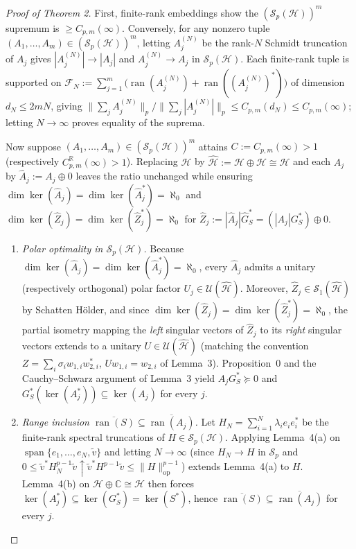 \documentclass[10pt,letterpaper]{article}
\newcommand{\C}{\mathbb{C}}
\newcommand{\R}{\mathbb{R}}
\newcommand{\Hilb}{\mathcal{H}}
\newcommand{\Sp}{\mathcal{S}_p}
\newcommand{\ran}{\operatorname{ran}}
\newcommand{\op}{\mathrm{op}}
\begin{document}
\begin{proof}[Proof of Theorem 2]
First, finite-rank embeddings show the $(\Sp(\Hilb))^m$ supremum is $\ge C_{p,m}(\infty)$. Conversely, for any nonzero tuple $(A_1,\dots,A_m) \in (\Sp(\Hilb))^m$, letting $A_j^{(N)}$ be the rank-$N$ Schmidt truncation of $A_j$ gives $|A_j^{(N)}| \to |A_j|$ and $A_j^{(N)} \to A_j$ in $\Sp(\Hilb)$. Each finite-rank tuple is supported on $\mathcal{F}_N := \sum_{j=1}^m\bigl(\ran(A_j^{(N)}) + \ran((A_j^{(N)})^*)\bigr)$ of dimension $d_N \le 2mN$, giving $\|\sum_j A_j^{(N)}\|_p / \|\sum_j |A_j^{(N)}|\|_p \le C_{p,m}(d_N) \le C_{p,m}(\infty)$; letting $N \to \infty$ proves equality of the suprema.

Now suppose $(A_1,\dots,A_m) \in (\Sp(\Hilb))^m$ attains $C := C_{p,m}(\infty) > 1$ (respectively $C_{p,m}^{\R}(\infty) > 1$). Replacing $\Hilb$ by $\widehat{\Hilb} := \Hilb \oplus \Hilb \cong \Hilb$ and each $A_j$ by $\widehat{A}_j := A_j \oplus 0$ leaves the ratio unchanged while ensuring $\dim\ker(\widehat{A}_j) = \dim\ker(\widehat{A}_j^*) = \aleph_0$ and $\dim\ker(\widehat{Z}_j) = \dim\ker(\widehat{Z}_j^*) = \aleph_0$ for $\widehat{Z}_j := |\widehat{A}_j|\widehat{G}_S^* = (|A_j|G_S^*) \oplus 0$.
\begin{enumerate}[leftmargin=1.6em,itemsep=2pt]
  \item \emph{Polar optimality in $\Sp(\Hilb)$.} Because $\dim\ker(\widehat{A}_j) = \dim\ker(\widehat{A}_j^*) = \aleph_0$, every $\widehat{A}_j$ admits a unitary (respectively orthogonal) polar factor $U_j \in \mathcal{U}(\widehat{\Hilb})$. Moreover, $\widehat{Z}_j \in \mathcal{S}_1(\widehat{\Hilb})$ by Schatten H\"older, and since $\dim\ker(\widehat{Z}_j) = \dim\ker(\widehat{Z}_j^*) = \aleph_0$, the partial isometry mapping the \emph{left} singular vectors of $\widehat{Z}_j$ to its \emph{right} singular vectors extends to a unitary $U \in \mathcal{U}(\widehat{\Hilb})$ (matching the convention $Z = \sum_i \sigma_i w_{1,i} w_{2,i}^*$, $U w_{1,i} = w_{2,i}$ of Lemma~3). Proposition~0 and the Cauchy--Schwarz argument of Lemma~3 yield $A_j G_S^* \succeq 0$ and $G_S^*(\ker(A_j^*)) \subseteq \ker(A_j)$ for every $j$.
  \item \emph{Range inclusion $\overline{\ran(S)} \subseteq \overline{\ran(A_j)}$.} Let $H_N = \sum_{i=1}^N \lambda_i e_i e_i^*$ be the finite-rank spectral truncations of $H \in \Sp(\Hilb)$. Applying Lemma~4(a) on $\operatorname{span}\{e_1,\dots,e_N,\tilde{v}\}$ and letting $N \to \infty$ (since $H_N \to H$ in $\Sp$ and $0 \le \tilde{v}^* H_N^{p-1}\tilde{v} \uparrow \tilde{v}^* H^{p-1}\tilde{v} \le \|H\|_{\op}^{p-1}$) extends Lemma~4(a) to $H$. Lemma~4(b) on $\Hilb \oplus \C \cong \Hilb$ then forces $\ker(A_j^*) \subseteq \ker(G_S^*) = \ker(S^*)$, hence $\overline{\ran(S)} \subseteq \overline{\ran(A_j)}$ for every $j$.

\end{enumerate}
\end{proof}
\end{document}
